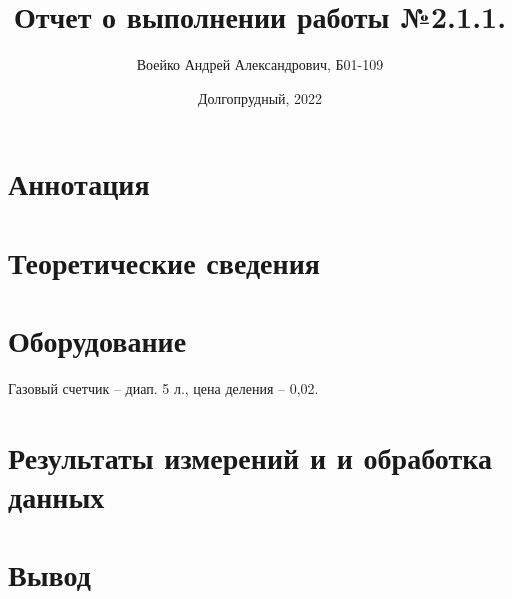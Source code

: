 \documentclass[a4paper,11pt]{article}
\title{Отчет о выполнении работы №2.1.1.}
\author{Воейко Андрей Александрович, Б01-109}
\date{Долгопрудный, 2022}
\begin{document}
\maketitle
\newpage
\section{Аннотация}

\section{Теоретические сведения}
\section{Оборудование}
Газовый счетчик -- диап. 5 л., цена деления -- 0,02.

\section{Результаты измерений и и обработка данных}
\section{Вывод}
\end{document}
